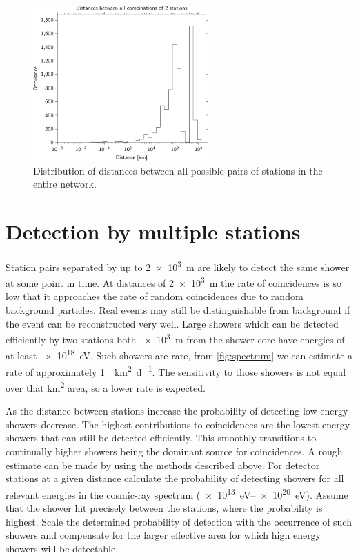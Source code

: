 \begin{figure}
    \centering
    \includegraphics[width=0.6\textwidth]
                    {plots/cluster/network_station_distances}
    \caption{Distribution of distances between all possible pairs of stations in the entire \hisparc network.}
    \label{fig:network_station_distances}
\end{figure}



\section{Detection by multiple stations}

Station pairs separated by up to \SI{2e3}{\meter} are likely to detect the same shower at some point in time. At distances of \SI{2e3}{\meter} the rate of coincidences is so low that it approaches the rate of random coincidences due to random background particles. Real events may still be distinguishable from background if the event can be reconstructed very well. Large showers which can be detected efficiently by two stations both \SI{e3}{\meter} from the shower core have energies of at least \SI{e18}{\eV}. Such showers are rare, from \cref{fig:spectrum} we can estimate a rate of approximately \SI{1}{\per\kilo\meter\squared\per\day}. The sensitivity to those showers is not equal over that \si{\kilo\meter\squared} area, so a lower rate is expected.

As the distance between stations increase the probability of detecting low energy showers decrease. The highest contributions to coincidences are the lowest energy showers that can still be detected efficiently. This smoothly transitions to continually higher showers being the dominant source for coincidences. A rough estimate can be made by using the methods described above. For detector stations at a given distance calculate the probability of detecting showers for all relevant energies in the cosmic-ray spectrum (\SIrange{e13}{e20}{\eV}). Assume that the shower hit precisely between the stations, where the probability is highest. Scale the determined probability of detection with the occurrence of such showers and compensate for the larger effective area for which high energy showers will be detectable.

